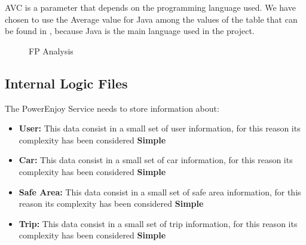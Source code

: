 AVC is a parameter that depends on the programming language used. We have chosen to use the Average value for Java among the values of the table that can be found in \cite{AVCTable}, because Java is the main language used in the project. 

\begin{figure}[h]
	\centering
	\caption{FP Analysis}
\end{figure}
\FloatBarrier


\subsection{Internal Logic Files} 

The PowerEnjoy Service needs to store information about:

\begin{itemize}
	\item \textbf{User:} This data consist in a small set of user information, for this reason its complexity has been considered \textbf{Simple}
	\item \textbf{Car:} This data consist in a small set of car information, for this reason its complexity has been considered \textbf{Simple}
	\item \textbf{Safe Area:} This data consist in a small set of safe area information, for this reason its complexity has been considered \textbf{Simple}
	\item \textbf{Trip:} This data consist in a small set of trip information, for this reason its complexity has been considered \textbf{Simple}
\end{itemize}

